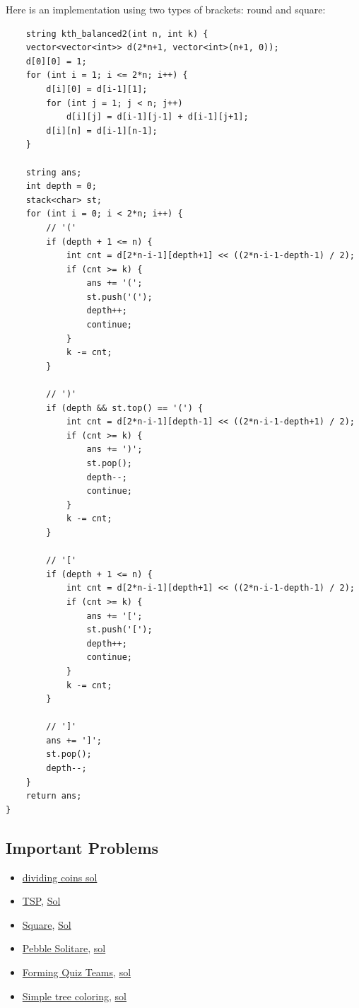 \documentclass[8pt, a4paper, oneside, twocolumn]{extarticle}
\begin{document}
Here is an implementation using two types of brackets: round and square:
\begin{verbatim}
	string kth_balanced2(int n, int k) {
    vector<vector<int>> d(2*n+1, vector<int>(n+1, 0));
    d[0][0] = 1;
    for (int i = 1; i <= 2*n; i++) {
        d[i][0] = d[i-1][1];
        for (int j = 1; j < n; j++)
            d[i][j] = d[i-1][j-1] + d[i-1][j+1];
        d[i][n] = d[i-1][n-1];
    }

    string ans;
    int depth = 0;
    stack<char> st;
    for (int i = 0; i < 2*n; i++) {
        // '('
        if (depth + 1 <= n) {
            int cnt = d[2*n-i-1][depth+1] << ((2*n-i-1-depth-1) / 2);
            if (cnt >= k) {
                ans += '(';
                st.push('(');
                depth++;
                continue;
            }
            k -= cnt;
        }

        // ')'
        if (depth && st.top() == '(') {
            int cnt = d[2*n-i-1][depth-1] << ((2*n-i-1-depth+1) / 2);
            if (cnt >= k) {
                ans += ')';
                st.pop();
                depth--;
                continue;
            }
            k -= cnt;
        }
            
        // '['
        if (depth + 1 <= n) {
            int cnt = d[2*n-i-1][depth+1] << ((2*n-i-1-depth-1) / 2);
            if (cnt >= k) {
                ans += '[';
                st.push('[');
                depth++;
                continue;
            }
            k -= cnt;
        }

        // ']'
        ans += ']';
        st.pop();
        depth--;
    }
    return ans;
}
\end{verbatim}
\subsection{Important Problems}
\begin{itemize}
    \item \href{https://gist.github.com/sourabhxyz/b0f96d91095c812b6100874667724a17}{dividing coins sol}
    \item \href{https://uva.onlinejudge.org/external/104/10496.pdf}{TSP}, \href{https://gist.github.com/sourabhxyz/52e95aab8f9ff43c17a6143ea80d7108}{Sol}
    \item \href{https://uva.onlinejudge.org/external/103/10364.pdf}{Square}, \href{https://gist.github.com/sourabhxyz/b043d57f0aea7d66edadb747d1c9a9d2}{Sol}
    \item \href{https://uva.onlinejudge.org/external/106/10651.pdf}{Pebble Solitare}, \href{https://gist.github.com/sourabhxyz/03ee5ac77c042b2ee5d3188b745b2c0b}{sol}
    \item \href{https://uva.onlinejudge.org/external/109/10911.pdf}{Forming Quiz Teams}, \href{https://gist.github.com/sourabhxyz/4985382867071c0518c9dd8b8fd727e9}{sol}
    \item \href{https://uva.onlinejudge.org/external/113/11307.pdf}{Simple tree coloring}, \href{https://gist.github.com/sourabhxyz/fc1112b44a455310f601967768e1d212}{sol}
\end{itemize}
\end{document}
